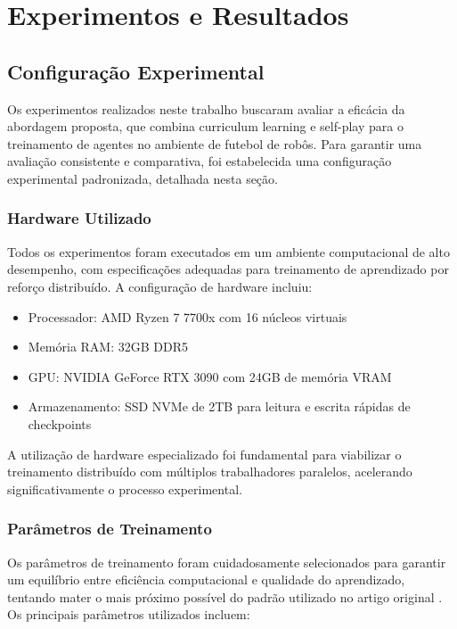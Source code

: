 \chapter{Experimentos e Resultados}
\label{cap:resultados}

\section{Configuração Experimental}
\label{sec:configuracao_experimental}

Os experimentos realizados neste trabalho buscaram avaliar a eficácia da abordagem proposta, que combina curriculum learning e self-play para o treinamento de agentes no ambiente de futebol de robôs. Para garantir uma avaliação consistente e comparativa, foi estabelecida uma configuração experimental padronizada, detalhada nesta seção.

\subsection{Hardware Utilizado}

Todos os experimentos foram executados em um ambiente computacional de alto desempenho, com especificações adequadas para treinamento de aprendizado por reforço distribuído. A configuração de hardware incluiu:

\begin{itemize}
    \item Processador: AMD Ryzen 7 7700x com 16 núcleos virtuais
    \item Memória RAM: 32GB DDR5
    \item GPU: NVIDIA GeForce RTX 3090 com 24GB de memória VRAM
    \item Armazenamento: SSD NVMe de 2TB para leitura e escrita rápidas de checkpoints
\end{itemize}

A utilização de hardware especializado foi fundamental para viabilizar o treinamento distribuído com múltiplos trabalhadores paralelos, acelerando significativamente o processo experimental.

\subsection{Parâmetros de Treinamento}

Os parâmetros de treinamento foram cuidadosamente selecionados para garantir um equilíbrio entre eficiência computacional e qualidade do aprendizado, tentando mater o mais próximo possível do padrão utilizado no artigo original \cite{bruno_brandao}. Os principais parâmetros utilizados incluem:

